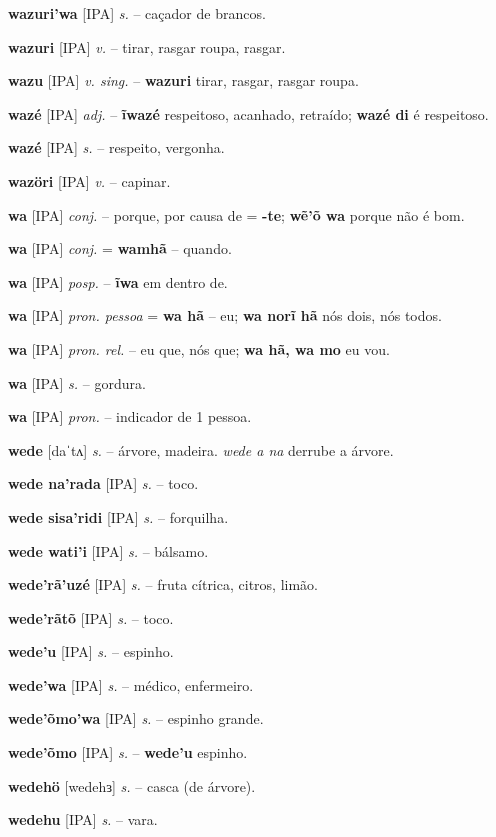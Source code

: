 \textbf{wazuri'wa} [IPA] \textit{s.} -- caçador de brancos.

\textbf{wazuri} [IPA] \textit{v.} -- tirar, rasgar roupa, rasgar.

\textbf{wazu} [IPA] \textit{v. sing.} -- \textbf{wazuri} tirar, rasgar, rasgar roupa.

\textbf{wazé} [IPA] \textit{adj.} -- \textbf{ĩwazé} respeitoso, acanhado, retraído; \textbf{wazé di} é respeitoso.

\textbf{wazé} [IPA] \textit{s.} -- respeito, vergonha.

\textbf{wazöri} [IPA] \textit{v.} -- capinar.

\textbf{wa} [IPA] \textit{conj.} -- porque, por causa de = \textbf{-te}; \textbf{wẽ'õ wa} porque não é bom.

\textbf{wa} [IPA] \textit{conj.} = \textbf{wamhã} -- quando.

\textbf{wa} [IPA] \textit{posp.} -- \textbf{ĩwa} em dentro de.

\textbf{wa} [IPA] \textit{pron. pessoa} = \textbf{wa hã} -- eu; \textbf{wa norĩ hã} nós dois, nós todos.

\textbf{wa} [IPA] \textit{pron. rel.} -- eu que, nós que; \textbf{wa hã, wa mo} eu vou.

\textbf{wa} [IPA] \textit{s.} -- gordura.

\textbf{wa} [IPA] \textit{pron.} -- indicador de 1 pessoa.

\textbf{wede} [daˈtʌ] \textit{s.} -- árvore, madeira. \textit{wede a na} derrube a árvore.

\textbf{wede na'rada} [IPA] \textit{s.} -- toco.

\textbf{wede sisa'ridi} [IPA] \textit{s.} -- forquilha.

\textbf{wede wati'i} [IPA] \textit{s.} -- bálsamo.

\textbf{wede'rã'uzé} [IPA] \textit{s.} -- fruta cítrica, citros, limão.

\textbf{wede'rãtõ} [IPA] \textit{s.} -- toco.

\textbf{wede'u} [IPA] \textit{s.} -- espinho.

\textbf{wede'wa} [IPA] \textit{s.} -- médico, enfermeiro.

\textbf{wede'õmo'wa} [IPA] \textit{s.} -- espinho grande.

\textbf{wede'õmo} [IPA] \textit{s.} -- \textbf{wede'u} espinho.

\textbf{wedehö} [wedehɜ] \textit{s.} -- casca (de árvore).

\textbf{wedehu} [IPA] \textit{s.} -- vara.

